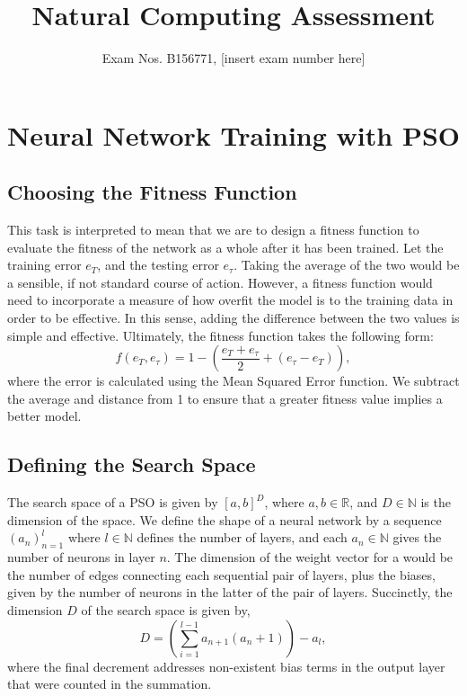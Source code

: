 \documentclass[12pt]{article}
\title{Natural Computing Assessment}
\author{Exam Nos. B156771, [insert exam number here]}
\begin{document}
\maketitle
\section{Neural Network Training with PSO}
\subsection{Choosing the Fitness Function}
This task is interpreted to mean that we are to design a fitness function to evaluate the fitness of the network as a whole after it has been trained.
Let the training error $e_T$, and the testing error $e_\tau$. 
Taking the average of the two would be a sensible, if not standard course of action. 
However, a fitness function would need to incorporate a measure of how overfit the model is to the training data in order to be effective. 
In this sense, adding the difference between the two values is simple and effective. 
Ultimately, the fitness function takes the following form:
\begin{equation}
    f(e_T, e_\tau) = 1 - \left(\frac{e_T + e_\tau}{2} + \left(e_\tau - e_T\right)\right),
\end{equation}
where the error is calculated using the Mean Squared Error function. We subtract the average and distance from 1 to ensure that a greater fitness value implies a better model.

\subsection{Defining the Search Space}
The search space of a PSO is given by $[a,b]^D$, where $a,b\in \mathbb{R}$, and $D\in\mathbb{N}$ is the dimension of the space. 
We define the shape of a neural network by a sequence $(a_n)_{n=1}^{l}$ where $l\in\mathbb{N}$ defines the number of layers, and each $a_n \in \mathbb{N}$ gives the number of neurons in layer $n$. 
The dimension of the weight vector for a would be the number of edges connecting each sequential pair of layers, plus the biases, given by the number of neurons in the latter of the pair of layers. Succinctly, the dimension $D$ of the search space is given by,
\begin{equation}
    D = \left(\sum_{i=1}^{l-1} a_{n+1}\left(a_n + 1\right)\right) - a_l,
\end{equation}
where the final decrement addresses non-existent bias terms in the output layer that were counted in the summation.
\end{document}
